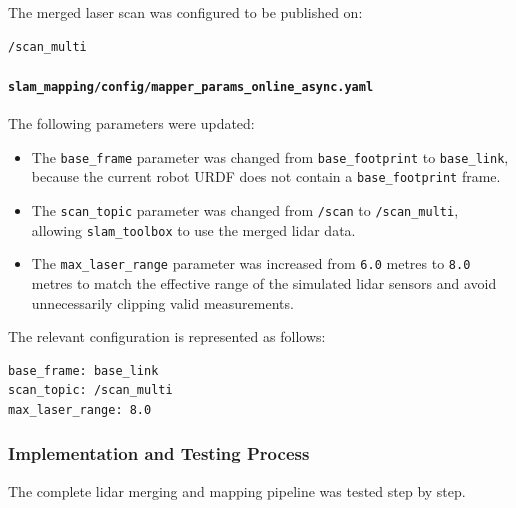 \documentclass{article}
\begin{document}
The merged laser scan was configured to be published on:

\begin{verbatim}
/scan_multi
\end{verbatim}

\paragraph{\texttt{slam\_mapping/config/mapper\_params\_online\_async.yaml}}

The following parameters were updated:

\begin{itemize}
    \item The \texttt{base\_frame} parameter was changed from
    \texttt{base\_footprint} to \texttt{base\_link}, because the current robot
    URDF does not contain a \texttt{base\_footprint} frame.

    \item The \texttt{scan\_topic} parameter was changed from
    \texttt{/scan} to \texttt{/scan\_multi}, allowing
    \texttt{slam\_toolbox} to use the merged lidar data.

    \item The \texttt{max\_laser\_range} parameter was increased from
    \texttt{6.0} metres to \texttt{8.0} metres to match the effective range
    of the simulated lidar sensors and avoid unnecessarily clipping valid
    measurements.
\end{itemize}

The relevant configuration is represented as follows:

\begin{verbatim}
base_frame: base_link
scan_topic: /scan_multi
max_laser_range: 8.0
\end{verbatim}

\subsubsection{Implementation and Testing Process}

The complete lidar merging and mapping pipeline was tested step by step.
\end{document}

